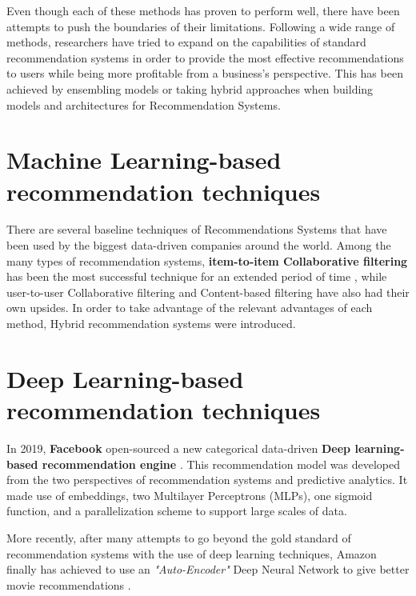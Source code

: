 \documentclass[manuscript,screen,natbib=false]{acmart}
\begin{document}
Even though each of these methods has proven to perform well, there have been attempts to push the boundaries of their limitations. Following a wide range of methods, researchers have tried to expand on the capabilities of standard recommendation systems in order to provide the most effective recommendations to users while being more profitable from a business's perspective. This has been achieved by ensembling models or taking hybrid approaches when building models and architectures for Recommendation Systems.

\section{Machine Learning-based recommendation techniques}
There are several baseline techniques of Recommendations Systems that have been used by the biggest data-driven companies around the world.
Among the many types of recommendation systems, \textbf{item-to-item Collaborative filtering} \cite{linden_amazoncom_2003} has been the most successful technique for an extended period of time \cite{smith_two_2017}, while user-to-user Collaborative filtering and Content-based filtering have also had their own upsides. In order to take advantage of the relevant advantages of each method, Hybrid recommendation systems \cite{geetha_hybrid_2018} were introduced. 


\section{Deep Learning-based recommendation techniques}
In 2019, \textbf{Facebook} open-sourced a new categorical data-driven \textbf{Deep learning-based recommendation engine} \cite{naumov_deep_2019, noauthor_we_2019}. This recommendation model was developed from the two perspectives of recommendation systems and predictive analytics. It made use of embeddings, two Multilayer Perceptrons (MLPs), one sigmoid function, \cite{freudenthaler_factorization_2011} and a parallelization scheme to support large scales of data.

More recently, after many attempts to go beyond the gold standard of recommendation systems \cite{linden_amazoncom_2003, smith_two_2017} with the use of deep learning techniques, Amazon finally has achieved to use an \emph{"Auto-Encoder"} Deep Neural Network to give better movie recommendations \cite{larry_history_2019}.
\end{document}
